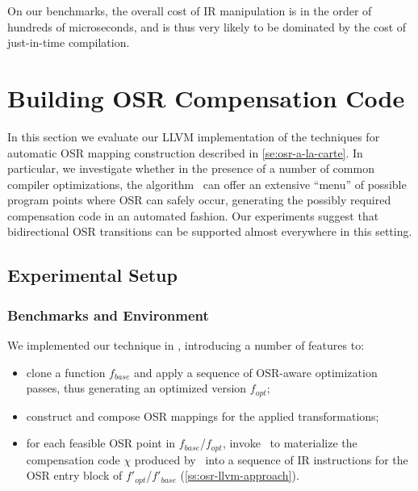 On our benchmarks, the overall cost of IR manipulation is in the order of hundreds of microseconds, and is thus very likely to be dominated by the cost of just-in-time compilation.


\section{Building OSR Compensation Code}
\label{se:eval-OSR-alC}

In this section we evaluate our LLVM implementation of the techniques for automatic OSR mapping construction described in \mysection\ref{se:osr-a-la-carte}. In particular, we investigate whether in the presence of a number of common compiler optimizations, the algorithm \buildcomp\ can offer an extensive ``menu'' of possible program points where OSR can safely occur, generating the possibly required compensation code in an automated fashion. Our experiments suggest that bidirectional OSR transitions can be supported almost everywhere in this setting.

\subsection{Experimental Setup}
\label{ss:bc-exp-setup}

\subsubsection*{Benchmarks and Environment}
We implemented our technique in \tinyvm, introducing a number of features to:
\begin{itemize}
 \item clone a function $f_{base}$ and apply a sequence of OSR-aware optimization passes, thus generating an optimized version $f_{opt}$;
 \item construct and compose OSR mappings for the applied transformations;
 \item for each feasible OSR point in $f_{base}$/$f_{opt}$, invoke \osrkit\ to materialize the compensation code $\chi$ produced by \reconstruct\ into a sequence of IR instructions for the OSR entry block of $f'_{opt}$/$f'_{base}$ (\mysection\ref{ss:osr-llvm-approach}).
\end{itemize}

